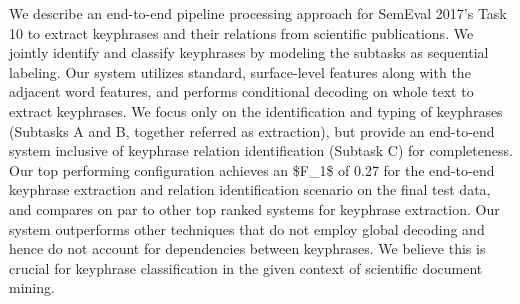 We describe an end-to-end pipeline processing approach for SemEval 2017's Task 10 to extract keyphrases and their relations from scientific publications.  We jointly identify and classify keyphrases by modeling the subtasks as sequential labeling.  Our system utilizes standard, surface-level features along with the adjacent word features, and performs conditional decoding on whole text to extract keyphrases. We focus only on the identification and typing of keyphrases (Subtasks A and B, together referred as extraction), but provide an end-to-end system inclusive of keyphrase relation identification (Subtask C) for completeness.  Our top performing configuration achieves an \$F\_1\$ of 0.27 for the end-to-end keyphrase extraction and relation identification scenario on the final test data, and compares on par to other top ranked systems for keyphrase extraction.  Our system outperforms other techniques that do not employ global decoding and hence do not account for dependencies between keyphrases. We believe this is crucial for keyphrase classification in the given context of scientific document mining.
